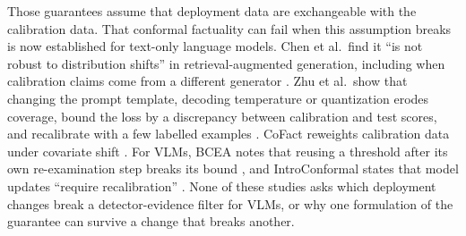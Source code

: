 \documentclass[journal]{IEEEtran}
\theoremstyle{remark}\newtheorem{remark}{Remark}
\begin{document}
Those guarantees assume that deployment data are exchangeable with the calibration data. That conformal factuality can fail when this assumption breaks is now established for text-only language models. Chen et al.\ find it ``is not robust to distribution shifts'' in retrieval-augmented generation, including when calibration claims come from a different generator \cite{chen2026conformalrag}. Zhu et al.\ show that changing the prompt template, decoding temperature or quantization erodes coverage, bound the loss by a discrepancy between calibration and test scores, and recalibrate with a few labelled examples \cite{zhu2026configuration}. CoFact reweights calibration data under covariate shift \cite{hu2026cofact}. For VLMs, BCEA notes that reusing a threshold after its own re-examination step breaks its bound \cite{xu2026bcea}, and IntroConformal states that model updates ``require recalibration'' \cite{atabuzzaman2026introconformal}. None of these studies asks which deployment changes break a detector-evidence filter for VLMs, or why one formulation of the guarantee can survive a change that breaks another.
\end{document}
